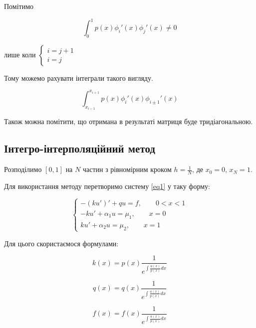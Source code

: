 \documentclass[14pt,a4paper]{scrartcl}
\begin{document}
	Помітимо
	
	\begin{equation} \label{eq5}
	\int_{0}^{1} p(x)\phi_{i}'(x)\phi_{j}'(x) \ne 0 
	\end{equation}
	
	лише коли $ \left\{
	\begin{array}{ll}
	i = j+1 \\
	i = j
	\end{array}\right.
	$
	
	Тому можемо рахувати інтеграли такого вигляду.
	
	\begin{equation} \label{eq6}
	\int_{x_{i-1}}^{x_{i+1}} p(x)\phi_{i}'(x)\phi_{i \pm 1}'(x)
	\end{equation}
	
	Також можна помітити, що отримана в результаті матриця буде тридіагональною. 
	
	\subsection{Інтегро-інтерполяційний метод}
	
	Розподілимо $[0,1]$ на $N$ частин з рівномірним кроком $h= \frac{1}{N}$, де $x_{0} = 0$, $x_{N} = 1$.
	
	Для використання методу перетворимо систему \ref{eq1} у таку форму:
	
	\begin{equation}\label{eq10}
	\left\{
	\begin{array}{ll}
		-(ku')' +qu = f,\qquad 0<x<1 \\
		-ku' + \alpha_{1}u = \mu_{1},\qquad x =0\\
		ku' + \alpha_{2}u = \mu_{2},\qquad x =1
	\end{array}\right.
	\end{equation}
	
	Для цього скористаємося формулами:
	
	\begin{equation}\label{eq11}
		k(x) = p(x)\frac{1}{e^{\int \frac{a(x)}{p(x)} dx}}
	\end{equation}

	\begin{equation}\label{eq12}
		q(x) = q(x) \frac{1}{e^{\int \frac{a(x)}{p(x)} dx}}
	\end{equation}	
	
	\begin{equation}\label{eq13}
		f(x) = f(x)\frac{1}{e^{\int \frac{a(x)}{p(x)} dx}}
	\end{equation}	
	
\end{document}
